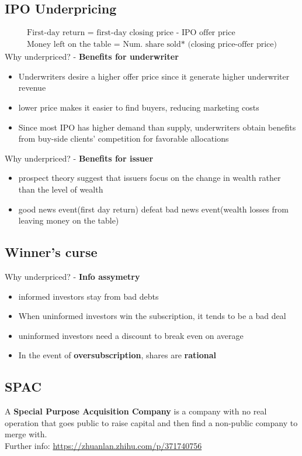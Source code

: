 \documentclass{article}
\theoremstyle{definition}
\theoremstyle{thrm}
\theoremstyle{lma}
\theoremstyle{ppst}
\theoremstyle{crlr}
\begin{document}
\subsection{IPO Underpricing}
\begin{align*}
	\text {First-day return = first-day closing price - IPO offer price}\\
	\text {Money left on the table = Num. share sold* (closing price-offer price)}
\end{align*}
Why underpriced? - \textbf{Benefits for underwriter}
\begin{itemize}
	\item Underwriters desire a higher offer price since it generate higher underwriter revenue
	\item lower price makes it easier to find buyers, reducing marketing costs
	\item Since most IPO has higher demand than supply, underwriters obtain benefits from buy-side clients' competition for favorable allocations
\end{itemize}
Why underpriced? - \textbf{Benefits for issuer}
\begin{itemize}
	\item prospect theory suggest that issuers focus on the change in wealth rather than the level of wealth
	\item good news event(first day return) defeat bad news event(wealth losses from leaving money on the table)
\end{itemize}
\subsection{Winner's curse}
Why underpriced? - \textbf{Info assymetry}
\begin{itemize}
	\item informed investors stay from bad debts
	\item When uninformed investors win the subscription, it tends to be a bad deal
	\item uninformed investors need a discount to break even on average
	\item In the event of \textbf{oversubscription}, shares are \textbf{rational}
\end{itemize}
\subsection{SPAC}
A \textbf{Special Purpose Acquisition Company} is a company with no real operation that goes public to raise capital and then find a non-public company to merge with.\\
Further info: \url{https://zhuanlan.zhihu.com/p/371740756}
\end{document}
